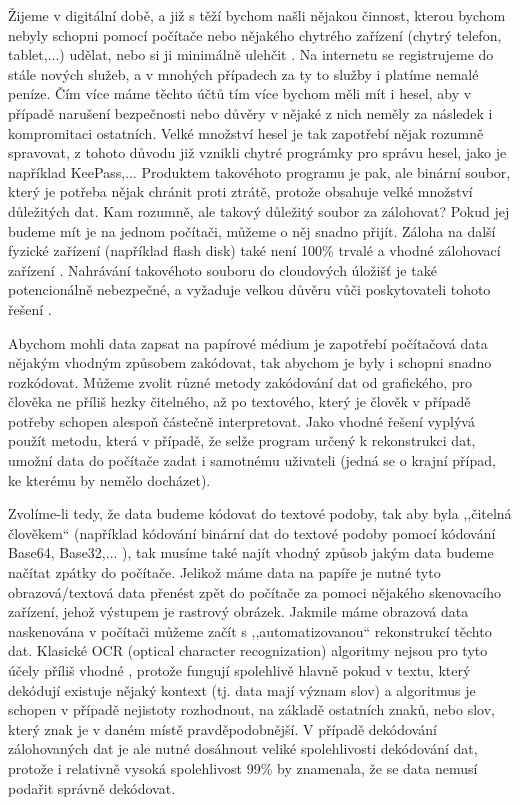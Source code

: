 \documentclass[conference]{IEEEtran}
\begin{document}
Žijeme v digitální době, a již s těží bychom našli nějakou činnost, kterou bychom nebyly schopni pomocí počítače nebo nějakého chytrého zařízení (chytrý telefon, tablet,...) udělat, nebo si ji minimálně ulehčit \cite{Ubicomp2001}.  Na internetu se registrujeme do stále nových služeb, a v mnohých případech za ty to služby i platíme nemalé peníze. Čím více máme těchto účtů tím více bychom měli mít i hesel, aby v případě narušení bezpečnosti nebo důvěry v nějaké z nich neměly za následek i kompromitaci ostatních. Velké množství hesel je tak zapotřebí nějak rozumně spravovat, z tohoto důvodu již vznikli chytré prográmky pro správu hesel, jako je například KeePass,... Produktem takovéhoto programu je pak, ale binární soubor, který je potřeba nějak chránit proti ztrátě, protože obsahuje velké množství důležitých dat. Kam rozumně, ale takový důležitý soubor za zálohovat? Pokud jej budeme mít je na jednom počítači, můžeme o něj snadno přijít. Záloha na další fyzické zařízení (například flash disk) také není 100\% trvalé a vhodné zálohovací zařízení \cite{DataStorageLifespans}. Nahrávání takovéhoto souboru do cloudových úložišť je také potencionálně nebezpečné, a vyžaduje velkou důvěru vůči poskytovateli tohoto řešení \cite{ALSMADI2018218}\cite{7MostFamousCloudSecurityBreaches}\cite{HowSecureIsYourData}. 

Abychom mohli data zapsat na papírové médium je zapotřebí počítačová data nějakým vhodným způsobem zakódovat, tak abychom je byly i schopni snadno rozkódovat. Můžeme zvolit různé metody zakódování dat od grafického, pro člověka ne příliš hezky čitelného, až po textového, který je člověk v případě potřeby schopen alespoň částečně interpretovat. Jako vhodné řešení vyplývá použít metodu, která v případě, že selže program určený k rekonstrukci dat, umožní data do počítače zadat i samotnému uživateli (jedná se o krajní případ, ke kterému by nemělo docházet). 

Zvolíme-li tedy, že data budeme kódovat do textové podoby, tak aby byla ,,čitelná člověkem`` (například kódování binární dat do textové podoby pomocí kódování Base64, Base32,... \cite{RFC4648}), tak musíme také najít vhodný způsob jakým data budeme načítat zpátky do počítače. Jelikož máme data na papíře je nutné tyto obrazová/textová data přenést zpět do počítače za pomoci nějakého skenovacího zařízení, jehož výstupem je rastrový obrázek. Jakmile máme obrazová data naskenována v počítači můžeme začít s ,,automatizovanou`` rekonstrukcí těchto dat. Klasické OCR (optical character recognization) algoritmy nejsou pro tyto účely příliš vhodné \cite{RecognizationVehicleLicencePlates}, protože fungují spolehlivě hlavně pokud v textu, který dekódují existuje nějaký kontext (tj. data mají význam slov) a algoritmus je schopen v případě nejistoty rozhodnout, na základě ostatních znaků, nebo slov, který znak je v daném místě pravděpodobnější. V případě dekódování zálohovaných dat je ale nutné dosáhnout veliké spolehlivosti dekódování dat, protože i relativně vysoká spolehlivost 99\% by znamenala, že se data nemusí podařit správně dekódovat.
\end{document}
